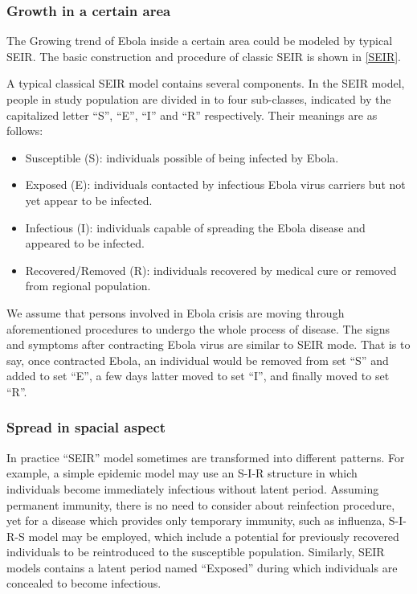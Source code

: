 \documentclass[11pt]{article}
\begin{document}
\subsubsection{Growth in a certain area}

The Growing trend of Ebola inside a certain area could be modeled by typical SEIR. The basic construction and procedure of classic SEIR is shown in \ref{SEIR}.

A typical classical SEIR model contains several components. In the SEIR model, people in study population are divided in to four sub-classes, indicated by the capitalized letter ``S'', ``E'', ``I'' and ``R'' respectively. Their meanings are as follows:
\begin{itemize}
\item Susceptible (S): individuals possible of being infected by Ebola.

\item Exposed (E): individuals contacted by infectious Ebola virus carriers but not yet appear to be infected.

\item Infectious (I): individuals capable of spreading the Ebola disease and appeared to be infected.

\item Recovered/Removed (R): individuals recovered by medical cure or removed from regional population.
\end{itemize}
We assume that persons involved in Ebola crisis are moving through aforementioned procedures to undergo the whole process of disease. The signs and symptoms after contracting Ebola virus are similar to SEIR mode. That is to say, once contracted Ebola, an individual would be removed from set ``S'' and added to set ``E'', a few days latter moved to set ``I'', and finally moved to set ``R''.

\subsubsection{Spread in spacial aspect}

In practice ``SEIR'' model sometimes are transformed into different patterns. For example, a simple epidemic model may use an S-I-R structure in which individuals become immediately infectious without latent period.  Assuming permanent immunity, there is no need to consider about reinfection procedure, yet for a disease which provides only temporary immunity, such as influenza, S-I-R-S model may be employed, which include a potential for previously recovered individuals to be reintroduced to the susceptible population. Similarly, SEIR models contains a latent period named ``Exposed'' during which individuals are concealed to become infectious. 
\end{document}
